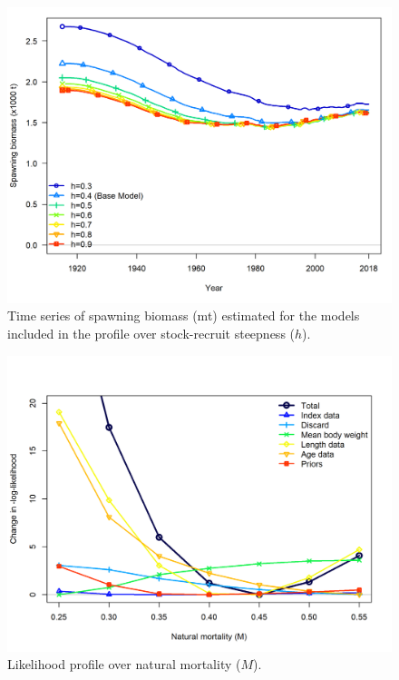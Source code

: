 \documentclass[12pt,]{article}
\begin{document}
\begin{figure}
\centering
\includegraphics{Figures/profile_h_compare1_spawnbio.png}
\caption{Time series of spawning biomass (mt) estimated for the models
included in the profile over stock-recruit steepness (\(h\)).
\label{fig:profile_h_compare1_spawnbio}}
\end{figure}

\FloatBarrier

\begin{figure}
\centering
\includegraphics{Figures/profile_M.png}
\caption{Likelihood profile over natural mortality (\(M\)).
\label{fig:profile_M}}
\end{figure}
\end{document}
